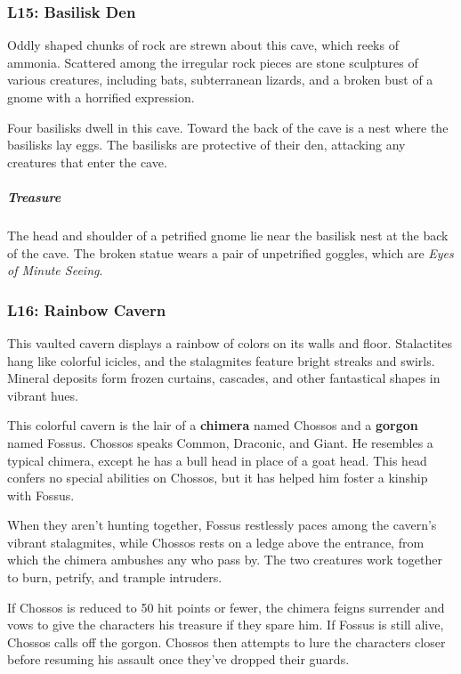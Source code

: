 \documentclass[10pt,a4paper,twoside,bg=print,twocolumn,openany,nodeprecatedcode]{dndbook}
\begin{document}
\subsubsection{L15: Basilisk Den}
\begin{DndReadAloud}{}
Oddly shaped chunks of rock are strewn about this cave, which reeks of ammonia. Scattered among the irregular rock pieces are stone sculptures of various creatures, including bats, subterranean lizards, and a broken bust of a gnome with a horrified expression.

\end{DndReadAloud}

Four basilisks dwell in this cave. Toward the back of the cave is a nest where the basilisks lay eggs. The basilisks are protective of their den, attacking any creatures that enter the cave.

\subparagraph{Treasure}
The head and shoulder of a petrified gnome lie near the basilisk nest at the back of the cave. The broken statue wears a pair of unpetrified goggles, which are \textit{Eyes of Minute Seeing}.

\subsubsection{L16: Rainbow Cavern}
\begin{DndReadAloud}{}
This vaulted cavern displays a rainbow of colors on its walls and floor. Stalactites hang like colorful icicles, and the stalagmites feature bright streaks and swirls. Mineral deposits form frozen curtains, cascades, and other fantastical shapes in vibrant hues.

\end{DndReadAloud}

This colorful cavern is the lair of a \textbf{chimera} named Chossos and a \textbf{gorgon} named Fossus. Chossos speaks Common, Draconic, and Giant. He resembles a typical chimera, except he has a bull head in place of a goat head. This head confers no special abilities on Chossos, but it has helped him foster a kinship with Fossus.

When they aren't hunting together, Fossus restlessly paces among the cavern's vibrant stalagmites, while Chossos rests on a ledge above the entrance, from which the chimera ambushes any who pass by. The two creatures work together to burn, petrify, and trample intruders.

If Chossos is reduced to 50 hit points or fewer, the chimera feigns surrender and vows to give the characters his treasure if they spare him. If Fossus is still alive, Chossos calls off the gorgon. Chossos then attempts to lure the characters closer before resuming his assault once they've dropped their guards.
\end{document}
